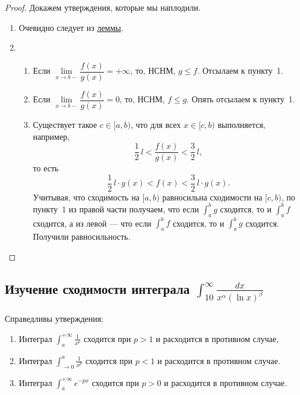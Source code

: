 \begin{proof}
	Докажем утверждения, которые мы наплодили.
	\begin{enumerate}
		\item Очевидно следует из \hyperlink{srshlem}{леммы}.
		\item
		\begin{enumerate}
			\item Если \(\lim\limits_{x \to b-} \dfrac{f(x)}{g(x)} = +\infty\), то, НСНМ, \(g \leqslant f\). Отсылаем к пункту~1.
			\item Если \(\lim\limits_{x \to b-} \dfrac{f(x)}{g(x)} = 0\), то, НСНМ, \(f \leqslant g\). Опять отсылаем к пункту~1.
			\item Существует такое \(c \in [a, b)\), что для всех \(x \in [c, b)\) выполняется, 	например, \[
				\frac{1}{2} \, l < \frac{f(x)}{g(x)} < \frac{3}{2} \, l,
			\]
			то есть \[
				\frac{1}{2} \, l  \cdot g(x) < f(x) < \frac{3}{2} \, l \cdot g(x).
			\]
			Учитывая, что сходимость на \([a, b)\) равносильна сходимости на \([c, b)\), по пункту~1 из правой части получаем, что если \(\int_a^b g\) сходится, то и \(\int_a^b f\) сходится, а из левой --- что если \(\int_a^b f\) сходится, то и \(\int_a^b g\) сходится. Получили равносильность.
		\end{enumerate}
	\end{enumerate}
\end{proof}

\subsection{Изучение сходимости интеграла $\int_{10}^\infty \frac{dx}{x^\alpha (\ln x)^\beta}$}

\begin{lemma}
	Справедливы утверждения:
	\begin{enumerate}
		\item Интеграл \(\displaystyle \int_a^{+\infty} \frac{1}{x^p}\) сходится при \(p > 1\) и расходится в противном случае,
		\item Интеграл \(\displaystyle \int_{\to 0}^a \frac{1}{x^p}\) сходится при \(p < 1\) и расходится в противном случае.
		\item Интеграл \(\displaystyle \int_a^{+\infty} e^{-p x}\) сходится при \(p > 0\) и расходится в противном случае.
	\end{enumerate}
	
\end{lemma}

